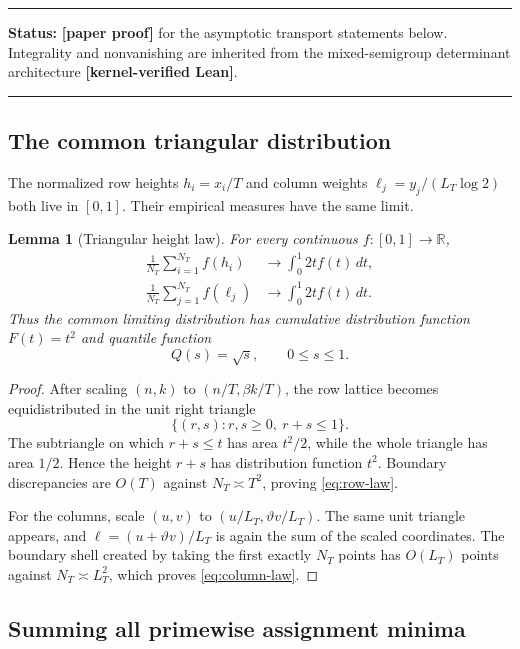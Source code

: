 \documentclass[11pt,oneside]{article}
\newtheorem{lemma}[theorem]{Lemma}
\theoremstyle{definition}
\theoremstyle{remark}
\newcommand{\R}{\mathbb R}
\newcommand{\statuslean}{\textcolor{leanblue}{\textbf{[kernel-verified Lean]}}}
\newcommand{\statusnew}{\textcolor{newgreen}{\textbf{[paper proof]}}}
\newenvironment{statusbox}[1]
{\begin{center}\begin{minipage}{0.94\textwidth}\raggedright\hbadness=10000\hrule
\vspace{0.45em}\textbf{Status:} #1\par\vspace{0.35em}}
{\vspace{0.35em}\hrule\end{minipage}\end{center}}
\begin{document}
\begin{statusbox}{\statusnew{} for the asymptotic transport statements below.  Integrality and
nonvanishing are inherited from the mixed-semigroup determinant architecture
\statuslean.}
\end{statusbox}

\subsection{The common triangular distribution}

The normalized row heights $h_i=x_i/T$ and column weights $\ell_j=y_j/(L_T\log2)$ both live in
$[0,1]$.  Their empirical measures have the same limit.

\begin{lemma}[Triangular height law]\label{lem:triangular-law}
For every continuous $f:[0,1]\to\R$,
\begin{align}
 \frac1{N_T}\sum_{i=1}^{N_T}f(h_i)
   &\longrightarrow \int_0^1 2t f(t)\,dt, \label{eq:row-law}\\
 \frac1{N_T}\sum_{j=1}^{N_T}f(\ell_j)
   &\longrightarrow \int_0^1 2t f(t)\,dt. \label{eq:column-law}
\end{align}
Thus the common limiting distribution has cumulative distribution function $F(t)=t^2$ and
quantile function
\begin{equation}\label{eq:triangular-quantile}
 Q(s)=\sqrt s,\qquad 0\le s\le1.
\end{equation}
\end{lemma}

\begin{proof}
After scaling $(n,k)$ to $(n/T,\beta k/T)$, the row lattice becomes equidistributed in the
unit right triangle
\[
 \{(r,s):r,s\ge0,\ r+s\le1\}.
\]
The subtriangle on which $r+s\le t$ has area $t^2/2$, while the whole triangle has area
$1/2$.  Hence the height $r+s$ has distribution function $t^2$.  Boundary discrepancies are
$O(T)$ against $N_T\asymp T^2$, proving \eqref{eq:row-law}.

For the columns, scale $(u,v)$ to $(u/L_T,\vartheta v/L_T)$.  The same unit triangle appears,
and $\ell=(u+\vartheta v)/L_T$ is again the sum of the scaled coordinates.  The boundary shell
created by taking the first exactly $N_T$ points has $O(L_T)$ points against
$N_T\asymp L_T^2$, which proves \eqref{eq:column-law}.
\end{proof}

\subsection{Summing all primewise assignment minima}
\end{document}

